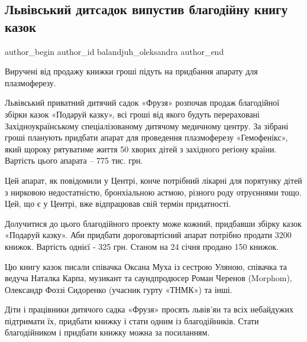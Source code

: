  
 
 
 
 
 
\subsection{Львівський дитсадок випустив благодійну книгу казок}
\label{sec:24_01_2022.stz.news.ua.zaxid.1.lviv_detsad_kniga_skazki}
 
\ifcmt
 author_begin
   author_id balandjuh_oleksandra
 author_end
\fi

\begin{zznagolos}
Виручені від продажу книжки гроші підуть на придбання апарату для плазмоферезу.
\end{zznagolos}

Львівський приватний дитячий садок «Фрузя» розпочав продаж благодійної збірки
казок «Подаруй казку», всі гроші від якого будуть перераховані
Західноукраїнському спеціалізованому дитячому медичному центру. За зібрані
гроші планують придбати апарат для проведення плазмоферезу «Гемофенікс», який
щороку рятуватиме життя 50 хворих дітей з західного регіону країни. Вартість
цього апарата – 775 тис. грн.


Цей апарат, як повідомили у Центрі, конче потрібний лікарні для порятунку дітей
з нирковою недостатністю, бронхіальною астмою, різного роду отруєннями тощо.
Цей, що є у Центрі, вже відпрацював свій термін придатності.

Долучитися до цього благодійного проекту може кожний, придбавши збірку казок
«Подаруй казку». Аби придбати дороговартісний апарат потрібно продати 3200
книжок. Вартість однієї - 325 грн. Станом на 24 січня продано 150 книжок.

Цю книгу казок писали співачка Оксана Муха із сестрою Уляною, співачка та
ведуча Наталка Карпа, музикант та саундпродюсер Роман Черенов (Morphom),
Олександр Фоззі Сидоренко (учасник гурту «ТНМК») та інші.

Діти і працівники дитячого садка «Фрузя» просять львів’ян та всіх небайдужих
підтримати їх, придбати книжку і стати одним із благодійників. Стати
благодійником і придбати книжку можна за посиланням.

